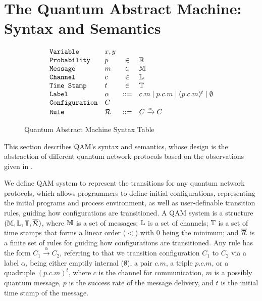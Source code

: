 \section{The Quantum Abstract Machine:  Syntax and Semantics} \label{sec:qam}

\begin{figure}[t]
{\small
  \[\begin{array}{llcl} 
      \texttt{Variable} & x,y \\
      \texttt{Probability} & p &\in &\mathbb{R}\\
      \texttt{Message} & m &\in& \mathbb{M}\\
    \texttt{Channel} & c &\in& \mathbb{L}\\
    \texttt{Time Stamp} & t &\in& \mathbb{T}\\
    \texttt{Label} & \alpha &::=& c.m \mid p.c.m \mid (p.c.m)^t \mid \emptyset\\
      \texttt{Configuration} & C & \\
      \texttt{Rule} & \mathcal{R} & ::= & C \xrightarrow{\alpha} C \\
    \end{array}
  \]
}
\caption{Quantum Abstract Machine Syntax Table}
  \label{fig:q-pi-syntax}
\end{figure}

This section describes QAM's syntax and semantics, whose design is the abstraction of different quantum network protocols based on the observations given in .

We define QAM system to represent the transitions for any quantum network protocols, which allows programmers to define initial configurations, representing the initial programs and process environment, as well as user-definable transition rules, guiding how configurations are transitioned. A QAM system is a structure $(\mathbb{M},\mathbb{L},\mathbb{T},\overline{\mathcal{R}})$,
where $\mathbb{M}$ is a set of messages;
$\mathbb{L}$ is a set of channels;
$\mathbb{T}$ is a set of time stamps that forms a linear order ($<$) with $0$ being the minimum;
and $\overline{\mathcal{R}}$ is a finite set of rules for guiding how configurations are transitioned. 
Any rule has the form $C_1 \xrightarrow{\alpha} C_2$, referring to that we transition configuration $C_1$ to $C_2$ via a label $\alpha$, being either emptily internal ($\emptyset$), a pair $c.m$, a triple $p.c.m$, or a quadruple $(p.c.m)^t$, where $c$ is the channel for communication, $m$ is a possibly quantum message, $p$ is the success rate of the message delivery, and $t$ is the initial time stamp of the message.

